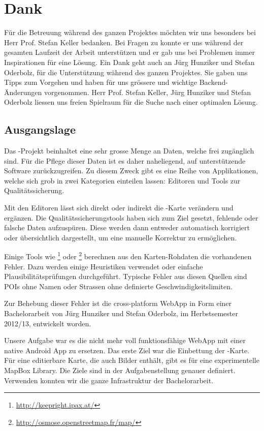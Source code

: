 \chapter*{Dank}
\thispagestyle{scrheadings}

Für die Betreuung während des ganzen Projektes möchten wir uns besonders bei Herr Prof. Stefan
Keller bedanken.
Bei Fragen zu  konnte er uns während der gesamten Laufzeit der Arbeit unterstützen und er gab uns bei Problemen immer Inspirationen für eine Lösung. 
Ein Dank geht auch an Jürg Hunziker und Stefan Oderbolz, für die Unterstützung während des ganzen Projektes.
Sie gaben uns Tipps zum Vorgehen und haben für uns grössere und wichtige Backend-Änderungen vorgenommen. 
Herr Prof. Stefan Keller, Jürg Hunziker und Stefan Oderbolz liessen uns freien Spielraum für die Suche nach einer optimalen Lösung.

\section*{Ausgangslage}
Das -Projekt beinhaltet eine sehr grosse Menge an Daten, welche frei zugänglich sind.
Für die Pflege dieser Daten ist es daher naheliegend, auf unterstützende Software zurückzugreifen.
Zu diesem Zweck gibt es eine Reihe von Applikationen, welche sich grob in zwei Kategorien einteilen lassen:
Editoren und Tools zur Qualitätssicherung.

Mit den Editoren lässt sich direkt oder indirekt die -Karte verändern und ergänzen.
Die Qualitätssicherungstools haben sich zum Ziel gesetzt, fehlende oder falsche Daten aufzuspüren.
Diese werden dann entweder automatisch korrigiert oder übersichtlich dargestellt, um eine manuelle Korrektur zu ermöglichen.

Einige Tools wie \footnote{\url{http://keepright.ipax.at/}} oder \footnote{\url{http://osmose.openstreetmap.fr/map/}} berechnen aus den Karten-Rohdaten die vorhandenen Fehler.
Dazu werden einige Heuristiken verwendet oder einfache Plausibilitätsprüfungen durchgeführt.
Typische Fehler aus diesen Quellen sind \glspl{POI} ohne Namen oder Strassen ohne definierte Geschwindigkeitslimiten.

Zur Behebung dieser Fehler ist die cross-platform \gls{WebApp} \kort{} in Form einer Bachelorarbeit von Jürg Hunziker und Stefan Oderbolz, im Herbstsemester 2012/13, entwickelt  worden.

Unsere Aufgabe war es die nicht mehr voll funktionsfähige \gls{WebApp} mit einer native Android App zu ersetzen.
Das erste Ziel war die Einbettung der -Karte.
Für eine editierbare Karte, die auch Bilder enthält, gibt es für  eine experimentelle MapBox Library. 
Die Ziele sind in der Aufgabenstellung genauer definiert.
Verwenden konnten wir die ganze Infrastruktur der \kort{} Bachelorarbeit.

